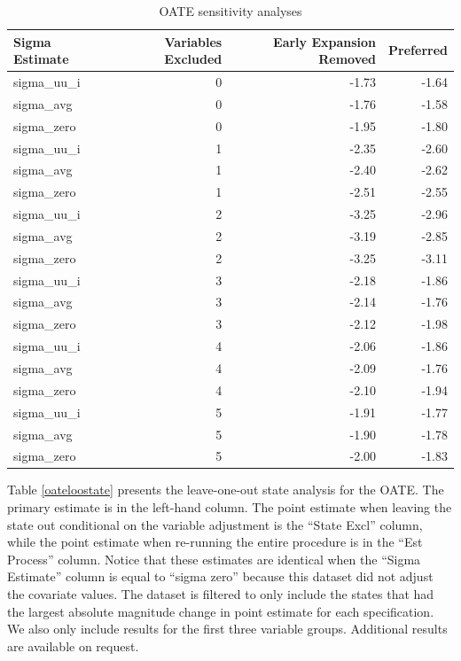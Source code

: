 \documentclass[12pt]{article}
\begin{document}
\begin{table}[ht]
\centering
\begin{tabular}{lrrr}
  \hline
Sigma Estimate & Variables Excluded & Early Expansion Removed & Preferred \\
  \hline
sigma\_uu\_i & 0 & -1.73 & -1.64 \\ 
  sigma\_avg & 0 & -1.76 & -1.58 \\ 
  sigma\_zero & 0 & -1.95 & -1.80 \\ 
  sigma\_uu\_i & 1 & -2.35 & -2.60 \\ 
  sigma\_avg & 1 & -2.40 & -2.62 \\ 
  sigma\_zero & 1 & -2.51 & -2.55 \\ 
  sigma\_uu\_i & 2 & -3.25 & -2.96 \\ 
  sigma\_avg & 2 & -3.19 & -2.85 \\ 
  sigma\_zero & 2 & -3.25 & -3.11 \\ 
  sigma\_uu\_i & 3 & -2.18 & -1.86 \\ 
  sigma\_avg & 3 & -2.14 & -1.76 \\ 
  sigma\_zero & 3 & -2.12 & -1.98 \\ 
  sigma\_uu\_i & 4 & -2.06 & -1.86 \\ 
  sigma\_avg & 4 & -2.09 & -1.76 \\ 
  sigma\_zero & 4 & -2.10 & -1.94 \\ 
  sigma\_uu\_i & 5 & -1.91 & -1.77 \\ 
  sigma\_avg & 5 & -1.90 & -1.78 \\ 
  sigma\_zero & 5 & -2.00 & -1.83 \\ 
   \hline
\end{tabular}
\caption{OATE sensitivity analyses}
\label{oatesensitive}
\end{table}

Table \ref{oateloostate} presents the leave-one-out state analysis for the OATE. The primary estimate is in the left-hand column. The point estimate when leaving the state out conditional on the variable adjustment is the ``State Excl'' column, while the point estimate when re-running the entire procedure is in the ``Est Process'' column. Notice that these estimates are identical when the ``Sigma Estimate'' column is equal to ``sigma zero'' because this dataset did not adjust the covariate values. The dataset is filtered to only include the states that had the largest absolute magnitude change in point estimate for each specification. We also only include results for the first three variable groups. Additional results are available on request.
\end{document}

